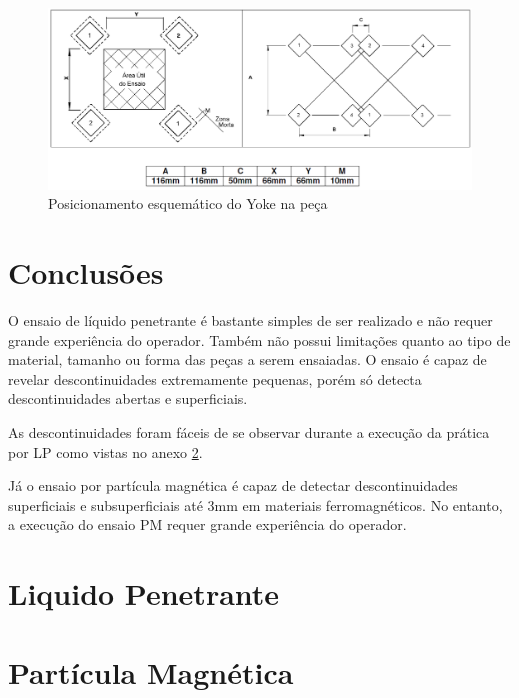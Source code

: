\documentclass[12pt,oneside]{article}
\begin{document}
\begin{figure}[b!]
    \centering
    \includegraphics[width = 0.85\linewidth]{figuras/pm-esquema.png}
    \caption{Posicionamento esquemático do Yoke na peça}
    \label{fig:pm-esquema}
\end{figure}

\clearpage
\section{Conclusões}
O ensaio de líquido penetrante é bastante simples de ser realizado e não
requer grande experiência do operador. Também não possui limitações quanto
ao tipo de material, tamanho ou forma das peças a serem ensaiadas.
O ensaio é capaz de revelar descontinuidades extremamente pequenas, porém
só detecta descontinuidades abertas e superficiais.

As descontinuidades foram fáceis de se observar durante a execução da prática
por LP como vistas no anexo \ref{anexo:lp}.


Já o ensaio por partícula magnética é capaz de detectar descontinuidades
superficiais e subsuperficiais até 3mm em materiais ferromagnéticos.
No entanto, a execução do ensaio PM requer grande experiência do operador.








\clearpage

\appendix
\section{Liquido Penetrante}
\label{anexo:lp}
\clearpage

\section{Partícula Magnética}
\label{anexo:pm}
\clearpage



\end{document}
